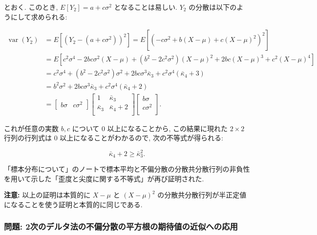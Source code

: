 \documentclass[
  letterpaper,
  DIV=11,
  numbers=noendperiod]{scrartcl}
\begin{document}
とおく. このとき, \(E[Y_2]=a+c\sigma^2\) となることは易しい. \(Y_2\)
の分散は以下のようにして求められる:

\[
\begin{aligned}
\operatorname{var}(Y_2) &=
E[(Y_2 - (a+c\sigma^2))^2] =
E[(-c\sigma^2 + b(X-\mu) + c(X-\mu)^2)^2]
\\ &=
E[c^2\sigma^4 -2bc\sigma^2(X-\mu) + (b^2 - 2c^2\sigma^2)(X-\mu)^2 +
2bc(X-\mu)^3 + c^2(X-\mu)^4]
\\ &=
c^2\sigma^4 + (b^2 - 2c^2\sigma^2)\sigma^2 + 2bc\sigma^3\bar\kappa_3 + c^2\sigma^4(\bar\kappa_4 + 3)
\\ &=
b^2\sigma^2 + 2bc\sigma^3\bar\kappa_3 + c^2\sigma^4(\bar\kappa_4 + 2)
\\ &=
\begin{bmatrix} b\sigma & c\sigma^2 \end{bmatrix}
\begin{bmatrix}
1     & \bar\kappa_3 \\
\bar\kappa_3 & \bar\kappa_4 + 2 \\
\end{bmatrix}
\begin{bmatrix}
b\sigma \\
c\sigma^2 \\
\end{bmatrix}.
\end{aligned}
\]

これが任意の実数 \(b,c\) について \(0\) 以上になることから,
この結果に現れた \(2\times 2\) 行列の行列式は \(0\)
以上になることがわかるので, 次の不等式が得られる:

\[
\bar\kappa_4 + 2 \ge \bar\kappa_3^2.
\]

「標本分布について」のノートで標本平均と不偏分散の分散共分散行列の非負性を用いて示した「歪度と尖度に関する不等式」が再び証明された.

\textbf{注意:} 以上の証明は本質的に \(X-\mu\) と \((X-\mu)^2\)
の分散共分散行列が半正定値になることを使う証明と本質的に同じである.

\hypertarget{ux554fux984c-2ux6b21ux306eux30c7ux30ebux30bfux6cd5ux306eux4e0dux504fux5206ux6563ux306eux5e73ux65b9ux6839ux306eux671fux5f85ux5024ux306eux8fd1ux4f3cux3078ux306eux5fdcux7528}{%
\subsubsection{問題:
2次のデルタ法の不偏分散の平方根の期待値の近似への応用}\label{ux554fux984c-2ux6b21ux306eux30c7ux30ebux30bfux6cd5ux306eux4e0dux504fux5206ux6563ux306eux5e73ux65b9ux6839ux306eux671fux5f85ux5024ux306eux8fd1ux4f3cux3078ux306eux5fdcux7528}}
\end{document}
